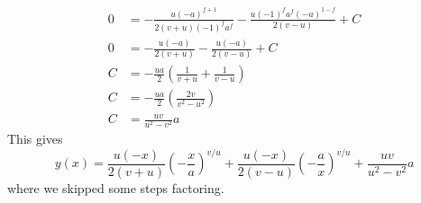 \documentclass{article}
\begin{document}
\begin{enumerate}
\begin{enumerate}
\begin{align}
            0 &= - \frac{u(-a)^{f+1}}{2(v+u)(-1)^{f}a^f} - \frac{u(-1)^fa^f(-a)^{1-f}}{2(v-u)}+C \\ 
            0 &= - \frac{u(-a)}{2(v+u)} - \frac{u(-a)}{2(v-u)}+C \\
            C &= -\frac{ua}{2}\left(\frac{1}{v+u}+\frac{1}{v-u}\right) \\ 
            C &= -\frac{ua}{2}\left(\frac{2v}{v^2-u^2}\right) \\ 
            C &= \frac{uv}{u^2-v^2}a
        \end{align}
        This gives
        \begin{equation}
            \boxed{y(x) = \frac{u(-x)}{2(v+u)}\left(-\frac{x}{a}\right)^{v/u} + \frac{u(-x)}{2(v-u)}\left(-\frac{a}{x}\right)^{v/u} + \frac{uv}{u^2-v^2}a}
        \end{equation}
        where we skipped some steps factoring.
    \end{enumerate}
\end{enumerate}
\end{document}

